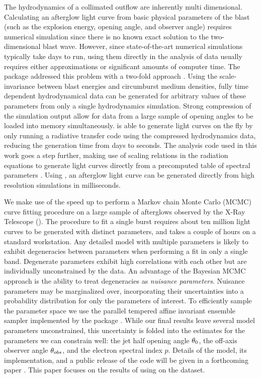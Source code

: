 The hydrodynamics of a collimated outflow are inherently multi dimensional.  Calculating an afterglow light curve from basic physical parameters of the blast (such as the explosion energy, opening angle, and observer angle) requires numerical simulation since there is no known exact solution to the two-dimensional blast wave.  However, since state-of-the-art numerical simulations typically take days to run, using them directly in the analysis of data usually requires either approximations or significant amounts of computer time.  The \boxfit{} package addressed this problem with a two-fold approach \citep{vanEer12boxfit}.  Using the scale-invariance between blast energies and circumburst medium densities, fully time dependent hydrodynamical data can be generated for arbitrary values of these parameters from only a single hydrodynamics simulation.  Strong compression of the simulation output allow for data from a large sample of opening angles to be loaded into memory simultaneously.  \boxfit{} is able to generate light curves on the fly by only running a radiative transfer code using the compressed hydrodynamics data, reducing the generation time from days to seconds.  The \scalefit{} analysis code \citep[][in prep]{vanEer14scalefit} used in this work goes a step further, making use of scaling relations in the radiation equations to generate light curves directly from a precomputed table of spectral parameters \citep{vanEer12scale}.  Using \scalefit{}, an afterglow light curve can be generated directly from high resolution simulations in milliseconds. 

We make use of the speed up to perform a Markov chain Monte Carlo (MCMC) curve fitting procedure on a large sample of afterglows observed by the \swift{} X-Ray Telescope (\swiftXRT{}).  The procedure to fit a single burst requires about ten million light curves to be generated with distinct parameters, and takes a couple of hours on a standard workstation.  Any detailed model with multiple parameters is likely to exhibit degeneracies between parameters when performing a fit in only a single band.  Degenerate parameters exhibit high correlations with each other but are individually unconstrained by the data.  An advantage of the Bayesian MCMC approach is the ability to treat degeneracies as \emph{nuisance parameters}.  Nuisance parameters may be marginalized over, incorporating their uncertainties into a probability distribution for only the parameters of interest.  To efficiently sample the parameter space we use the parallel tempered affine invariant ensemble sampler \citep{Goodman10} implemented by the \emcee{} package \citep{emcee}.  While our final results leave several model parameters unconstrained, this uncertainty is folded into the estimates for the parameters we can constrain well: the jet half opening angle $\theta_0$, the off-axis observer angle $\theta_{obs}$, and the electron spectral index $p$.  Details of the \scalefit{} model, its implementation, and a public release of the code will be given in a forthcoming paper \citep[][in prep]{vanEer14scalefit}.  This paper focuses on the results of using \scalefit{} on the \swiftXRT{} dataset.  

